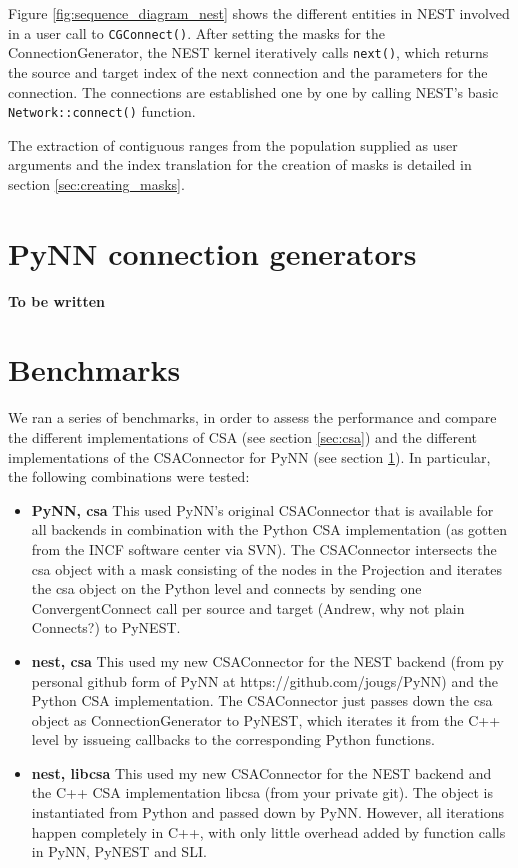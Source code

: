 \documentclass{frontiersSCNS} %
\newcommand{\tbw}[1]{{\bf\parindent0pt\color{red}#1}}
\begin{document}
Figure \ref{fig:sequence_diagram_nest} shows the different entities in
NEST involved in a user call to \texttt{CGConnect()}. After setting
the masks for the ConnectionGenerator, the NEST kernel iteratively
calls \texttt{next()}, which returns the source and target index of
the next connection and the parameters for the connection. The
connections are established one by one by calling NEST's basic
\texttt{Network::connect()} function.

The extraction of contiguous ranges from the population supplied as
user arguments and the index translation for the creation of masks is
detailed in section \ref{sec:creating_masks}.


\section{PyNN connection generators}\label{sec:conn_gen_pynn}
\tbw{To be written}


\section{Benchmarks}\label{sec:benchmarks}

We ran a series of benchmarks, in order to assess the performance and
compare the different implementations of CSA (see section
\ref{sec:csa}) and the different implementations of the CSAConnector
for PyNN (see section \ref{sec:conn_gen_pynn}). In particular, the
following combinations were tested:

\begin{itemize}
\item \textbf{PyNN, csa} This used PyNN's original CSAConnector that
  is available for all backends in combination with the Python CSA
  implementation (as gotten from the INCF software center via SVN).
  The CSAConnector intersects the csa object with a mask consisting of
  the nodes in the Projection and iterates the csa object on the
  Python level and connects by sending one ConvergentConnect call per
  source and target (Andrew, why not plain Connects?) to PyNEST.
\item \textbf{nest, csa} This used my new CSAConnector for the NEST
  backend (from py personal github form of PyNN at
  https://github.com/jougs/PyNN) and the Python CSA
  implementation. The CSAConnector just passes down the csa object as
  ConnectionGenerator to PyNEST, which iterates it from the C++ level
  by issueing callbacks to the corresponding Python functions.
\item \textbf{nest, libcsa} This used my new CSAConnector for the NEST
  backend and the C++ CSA implementation libcsa (from your private
  git). The object is instantiated from Python and passed down by
  PyNN. However, all iterations happen completely in C++, with only
  little overhead added by function calls in PyNN, PyNEST and SLI.
\end{itemize}
\end{document}
